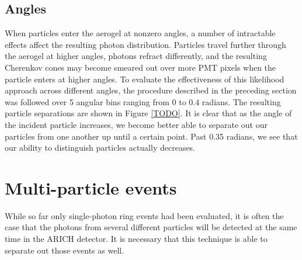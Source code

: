 \subsection{Angles}
When particles enter the aerogel at nonzero angles, a number of intractable effects affect the resulting photon distribution. 
Particles travel further through the aerogel at higher angles, photons refract differently, and the resulting Cherenkov cones may become smeared out over more PMT pixels when the particle enters at higher angles. 
To evaluate the effectiveness of this likelihood approach across different angles, the procedure described in the preceding section was followed over 5 angular bins ranging from 0 to 0.4 radians.
The resulting particle separations are shown in Figure \ref{TODO}.
It is clear that as the angle of the incident particle increases, we become better able to separate out our particles from one another up until a certain point.
Past 0.35 radians, we see that our ability to distinguish particles actually decreases.
 

\begin{figure}[]
\centering
{}
\caption[\TODO{}]{}
\label{fig:angleSeps}
\end{figure}

\section{Multi-particle events}
While so far only single-photon ring events had been evaluated, it is often the case that the photons from several different particles will be detected at the same time in the ARICH detector.
It is necessary that this technique is able to separate out those events as well. 

